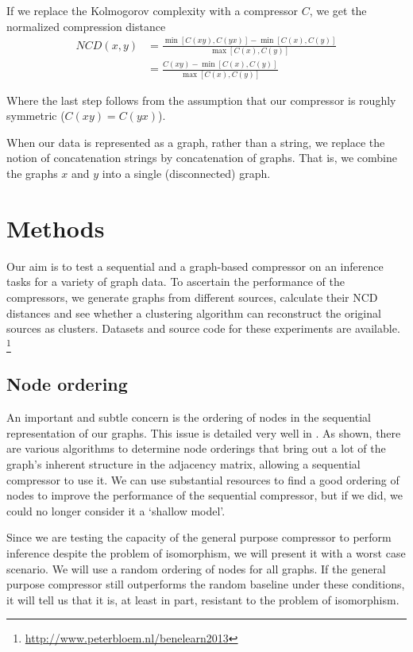 \documentclass{article}
\begin{document}
If we replace the Kolmogorov complexity with a compressor $C$, we get the normalized compression distance
\begin{align*}
NCD(x, y) 
	&= \frac{\min \left [C(xy), C(yx)\right ] - \min \left[C(x), C(y)\right]}{\max \left [C(x), C(y) \right ]}\\
	&= \frac{C(xy) - \min \left[C(x), C(y)\right]}{\max \left [C(x), C(y) \right ]} 
\end{align*}
 
Where the last step follows from the assumption that our compressor is roughly symmetric ($C(xy) = C(yx)$).

When our data is represented as a graph, rather than a string, we replace the notion of concatenation strings by concatenation of graphs. That is, we combine the graphs $x$ and $y$ into a single (disconnected) graph.

\section*{Methods}

Our aim is to test a sequential and a graph-based compressor on an inference tasks for a variety of graph data. To ascertain the performance of the compressors, we generate graphs from different sources, calculate their NCD distances and see whether a clustering algorithm can reconstruct the original sources as clusters. Datasets and source code for these experiments are available. \footnote{\url{http://www.peterbloem.nl/benelearn2013}}

\subsection*{Node ordering}

An important and subtle concern is the ordering of nodes in the sequential representation of our graphs. This issue is detailed very well in \cite{kang2011beyond}. As shown, there are various algorithms to determine node orderings that bring out a lot of the graph's inherent structure in the adjacency matrix, allowing a sequential compressor to use it. We can use substantial resources to find a good ordering of nodes to improve the performance of the sequential compressor, but if we did, we could no longer consider it a `shallow model'.

Since we are testing the capacity of the general purpose compressor to perform inference despite the problem of isomorphism, we will present it with a worst case scenario. We will use a random ordering of nodes for all graphs. If the general purpose compressor still outperforms the random baseline under these conditions, it will tell us that it is, at least in part, resistant to the problem of isomorphism.
\end{document}
